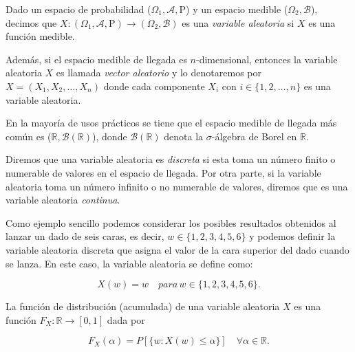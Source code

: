 \begin{definicion}\label{def:variable-aleatoria}
    Dado un espacio de probabilidad ($\Omega_1, \mathcal{A}, \mathrm{P}$) y un espacio medible ($\Omega_2, \mathcal{B}$), decimos que $X: (\Omega_1, \mathcal{A}, \mathrm{P}) \to (\Omega_2, \mathcal{B})$ es una \emph{variable aleatoria} si $X$ es una función medible.
\end{definicion}

Además, si el espacio medible de llegada es $n$-dimensional, entonces la variable aleatoria $X$ es llamada \textit{vector aleatorio} y lo denotaremos por $X = (X_1, X_2, \ldots, X_n)$ donde cada componente $X_i$ con $i \in \{1, 2, \ldots, n\}$ es una variable aleatoria.

\begin{observacion}
    En la mayoría de usos prácticos se tiene que el espacio medible de llegada más común es ($\mathbb{R}, \mathcal{B}(\mathbb{R})$), donde $\mathcal{B}(\mathbb{R})$ denota la $\sigma$-álgebra de Borel en $\mathbb{R}$.
\end{observacion}

\begin{definicion}
    Diremos que una variable aleatoria es \emph{discreta} si esta toma un número finito o numerable de valores en el espacio de llegada. Por otra parte, si la variable aleatoria toma un número infinito o no numerable de valores, diremos que es una variable aleatoria \emph{continua}.
\end{definicion}

\begin{ejemplo}
    Como ejemplo sencillo podemos considerar los posibles resultados obtenidos al lanzar un dado de seis caras, es decir, $w \in \{1,2,3,4,5,6\}$ y podemos definir la variable aleatoria discreta que asigna el valor de la cara superior del dado cuando se lanza. En este caso, la variable aleatoria se define como:

    \[ X(w) = w \quad para \, w \in \{1,2,3,4,5,6\}. \]
\end{ejemplo}

\begin{definicion}\label{def:funcion-de-distribucion}
    La función de distribución (acumulada) de una variable aleatoria $X$ es una función $F_X: \mathbb{R} \to [0,1]$ dada por

    \[ F_X(\alpha) = P[\{ w:X(w) \le \alpha\}] \quad \forall \alpha \in \mathbb{R}. \]
\end{definicion}

